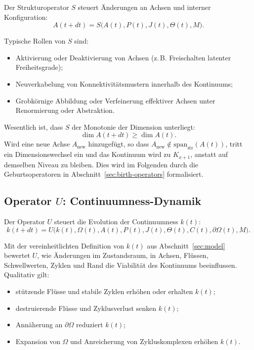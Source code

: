 Der Strukturoperator \(S\) steuert Änderungen an Achsen und interner
Konfiguration:
\[
  A(t+dt) = S\big(A(t), P(t), J(t), \Theta(t), M\big).
\]

Typische Rollen von \(S\) sind:
\begin{itemize}
  \item Aktivierung oder Deaktivierung von Achsen (z.\,B. Freischalten latenter
        Freiheitsgrade);
  \item Neuverkabelung von Konnektivitätsmustern innerhalb des Kontinuums;
  \item Grobkörnige Abbildung oder Verfeinerung effektiver Achsen unter
        Renormierung oder Abstraktion.
\end{itemize}

Wesentlich ist, dass \(S\) der Monotonie der Dimension unterliegt:
\[
  \dim A(t+dt) \ge \dim A(t).
\]
Wird eine neue Achse \(A_{\mathrm{new}}\) hinzugefügt, so dass
\(A_{\mathrm{new}} \notin \mathrm{span}_{\mathrm{str}}(A(t))\), tritt ein
Dimensionswechsel ein und das Kontinuum wird zu \(K_{x+1}\), anstatt auf demselben
Niveau zu bleiben. Dies wird im Folgenden durch die Geburtsoperatoren in
Abschnitt~\ref{sec:birth-operators} formalisiert.

\subsection{Operator \texorpdfstring{\texorpdfstring{$U$}{U}}{U}: Continuumness-Dynamik}

Der Operator \(U\) steuert die Evolution der Continuumness \(k(t)\):
\[
  k(t+dt) =
  U\big(k(t), \Omega(t), A(t), P(t), J(t),
        \Theta(t), C(t), \partial\Omega(t), M\big).
\]

Mit der vereinheitlichten Definition von \(k(t)\) aus Abschnitt~\ref{sec:model}
bewertet \(U\), wie Änderungen im Zustandsraum, in Achsen, Flüssen,
Schwellwerten, Zyklen und Rand die Viabilität des Kontinuums beeinflussen.
Qualitativ gilt:
\begin{itemize}
  \item stützende Flüsse und stabile Zyklen erhöhen oder erhalten \(k(t)\);
  \item destruierende Flüsse und Zyklusverlust senken \(k(t)\);
  \item Annäherung an \(\partial\Omega\) reduziert \(k(t)\);
  \item Expansion von \(\Omega\) und Anreicherung von Zykluskomplexen erhöhen
        \(k(t)\).
\end{itemize}

